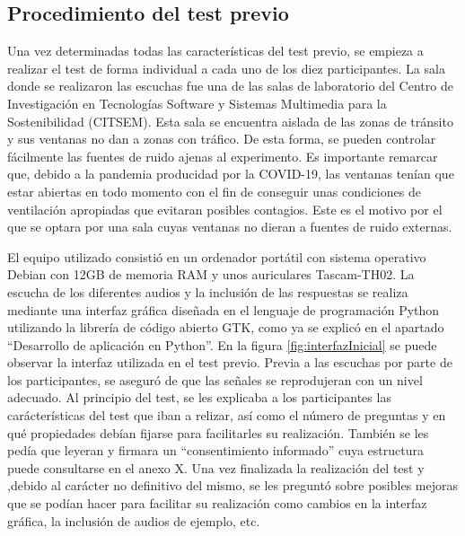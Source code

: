 \documentclass[11pt,a4paper,twoside]{book}
\begin{document}
            \subsection{Procedimiento del test previo}
                Una vez determinadas todas las características del test previo, se empieza a realizar el test de forma individual a cada uno de los diez participantes. La sala donde se realizaron las escuchas fue una de las salas de laboratorio del Centro de Investigación en Tecnologías Software y Sistemas Multimedia para la Sostenibilidad (CITSEM). Esta sala se encuentra aislada de las zonas de tránsito y sus ventanas no dan a zonas con tráfico. De esta forma, se pueden controlar fácilmente las fuentes de ruido ajenas al experimento. Es importante remarcar que, debido a la pandemia producidad por la COVID-19, las ventanas tenían que estar abiertas en todo momento con el fin de conseguir unas condiciones de ventilación apropiadas que evitaran posibles contagios. Este es el motivo por el que se optara por una sala cuyas ventanas no dieran a fuentes de ruido externas.
                
                El equipo utilizado consistió en un ordenador portátil con sistema operativo Debian con 12GB de memoria RAM y unos auriculares Tascam-TH02. La escucha de los diferentes audios y la inclusión de las respuestas se realiza mediante una interfaz gráfica diseñada en el lenguaje de programación Python utilizando la librería de código abierto GTK, como ya se explicó en el apartado ``Desarrollo de aplicación en Python''. En la figura \ref{fig:interfazInicial} se puede observar la interfaz utilizada en el test previo. Previa a las escuchas por parte de los participantes, se aseguró de que las señales se reprodujeran con un nivel adecuado. Al principio del test, se les explicaba a los participantes las carácterísticas del test que iban a relizar, así como el número de preguntas y en qué propiedades debían fijarse para facilitarles su realización. También se les pedía que leyeran y firmara un ``consentimiento informado'' cuya estructura puede consultarse en el anexo X. Una vez finalizada la realización del test y ,debido al carácter no definitivo del mismo, se les preguntó sobre posibles mejoras que se podían hacer para facilitar su realización como cambios en la interfaz gráfica, la inclusión de audios de ejemplo, etc.
                
\end{document}
